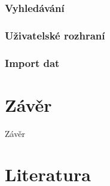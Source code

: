 \documentclass[11pt,oneside]{fithesis2}
\begin{document}
\subsection{Vyhledávání}

\subsection{Uživatelské rozhraní}

\subsection{Import dat}

\chapter{Závěr}
Závěr



\printindex

\begingroup
\def\tmpchapter{0}
\renewcommand{\chaptername}{}
\renewcommand{\thechapter}{}
\chapter{Literatura}
\renewcommand{\chapter}[2]{}%
\end{document}
